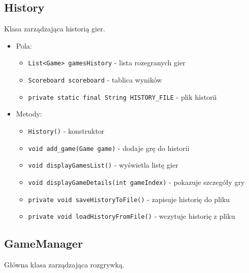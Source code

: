 \documentclass{article}
\begin{document}
\subsection{History}
Klasa zarządzająca historią gier.

\begin{itemize}
    \item Pola:
    \begin{itemize}
        \item \texttt{List<Game> gamesHistory} - lista rozegranych gier
        \item \texttt{Scoreboard scoreboard} - tablica wyników
        \item \texttt{private static final String HISTORY\_FILE} - plik historii
    \end{itemize}
    
    \item Metody:
    \begin{itemize}
        \item \texttt{History()} - konstruktor
        \item \texttt{void add\_game(Game game)} - dodaje grę do historii
        \item \texttt{void displayGamesList()} - wyświetla listę gier
        \item \texttt{void displayGameDetails(int gameIndex)} - pokazuje szczegóły gry
        \item \texttt{private void saveHistoryToFile()} - zapisuje historię do pliku
        \item \texttt{private void loadHistoryFromFile()} - wczytuje historię z pliku
    \end{itemize}
\end{itemize}

\subsection{GameManager}
Główna klasa zarządzająca rozgrywką.
\end{document}
